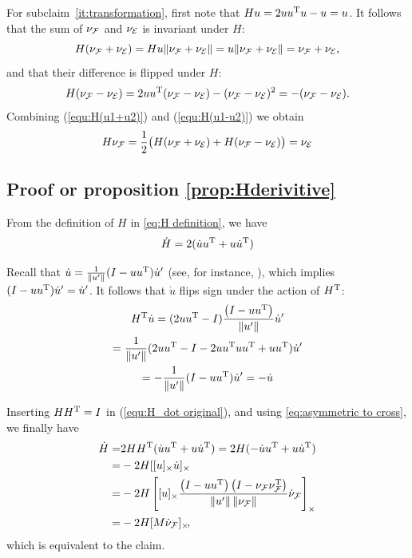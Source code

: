 \documentclass[journal]{IEEEtran}  %
\begin{document}
    For subclaim~\ref{it:transformation}, first note that $Hu=2uu^\mathrm{T} u - u=u$.
    It follows that the sum of $\nu_{\mathcal{F}}$ and $\nu_{\mathcal{E}}$ is invariant under $H$:
    \begin{equation}\label{equ:H(u1+u2)}
      H(\nu_{\mathcal{F}}+\nu_{\mathcal{E}})=H u \lVert\nu_{\mathcal{F}}+\nu_{\mathcal{E}}\rVert
      = u\lVert\nu_{\mathcal{F}}+\nu_{\mathcal{E}}\rVert =\nu_{\mathcal{F}}+\nu_{\mathcal{E}},
    \end{equation}
    and that their difference is flipped under $H$:
    \begin{equation}\label{equ:H(u1-u2)}
      H(\nu_{\mathcal{F}}-\nu_{\mathcal{E}}) = 2uu^\mathrm{T} (\nu_{\mathcal{F}}-\nu_{\mathcal{E}}) - (\nu_{\mathcal{F}}-\nu_{\mathcal{E}})^2 = -(\nu_{\mathcal{F}}-\nu_{\mathcal{E}}).
    \end{equation}
    Combining (\ref{equ:H(u1+u2)}) and (\ref{equ:H(u1-u2)}) we obtain
    \begin{equation}
      H\nu_{\mathcal{F}} = \frac{1}{2}\bigl(H(\nu_{\mathcal{F}}+\nu_{\mathcal{E}})+H(\nu_{\mathcal{F}}-\nu_{\mathcal{E}})\bigr)
      = \nu_{\mathcal{E}}
    \end{equation}

\subsection{Proof or proposition \ref{prop:Hderivitive}} \label{proof:Hderivitive}
    From the definition of $H$ in \eqref{eq:H definition}, we have
    \begin{equation} \label{equ:H_dot original}
      \dot H =   2(\dot u u^\mathrm{T} + u \dot u^\mathrm{T})
    \end{equation}

    Recall that $\dot{u}=\frac{1}{\lVert u'\rVert}(I-uu^\mathrm{T})\dot{u}'$ (see, for instance, \cite{Tron:Arxiv14}), which implies $(I-uu^\mathrm{T})\dot{u}'=\dot{u}'$. It follows that $\dot{u}$ flips sign under the action of $H^\mathrm{T}$:
    \begin{multline}
      H^\mathrm{T} \dot u = (2u u^\mathrm{T}-I)\frac{ \left( I - u u^\mathrm{T} \right) } {\left\|u'\right\|} \dot u' \\
      =\frac{1}{\lVert u'\rVert} (2u u^\mathrm{T}-I-2u u^\mathrm{T} u u^\mathrm{T}+u u^\mathrm{T})\dot{u}'\\
      = -\frac{1}{\lVert u'\rVert} (I-u u^\mathrm{T})\dot u'
      = -\dot u
    \end{multline}

    Inserting $HH^\mathrm{T}=I$ in (\ref{equ:H_dot original}), and using \ref{eq:asymmetric to cross}, we finally have
    \begin{equation}
      \begin{split}
        \dot H =  &  2H H^\mathrm{T}(\dot u u^\mathrm{T} + u \dot u^\mathrm{T})
        =  2 H (-\dot u u^\mathrm{T} + u \dot u^\mathrm{T})\\
        =  &  -2H [[u]_{\times} \dot u]_{\times} \\
        = &  -2 H \left[ [u]_{\times}  \frac{ \left( I - u u^\mathrm{T} \right) \left( I- \nu_{\mathcal{F}} \nu_{\mathcal{F}}^\mathrm{T} \right)} {\left\|u'\right\| \left\|\nu_{\mathcal{F}}\right\|} \dot{\nu}_{\mathcal{F}}\right]_{\times}\\
        = & -2 H [M \dot{\nu}_{\mathcal{F}}]_{\times}\!,
      \end{split}
    \end{equation}
    which is equivalent to the claim.
  
\end{document}
